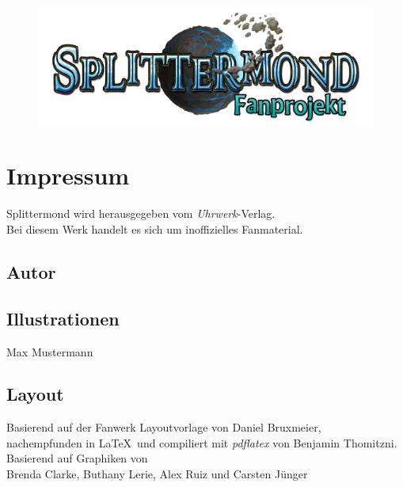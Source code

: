 \documentclass[12pt, a4paper, twoside, openany]{book}
\begin{document}
{%

        {%
            \begin{center}
                    \color{spmblue}
                    \fontsize{40}{50}
                    \selectfont
                    \textbf{\MyTitle}
            \end{center}
       }%
       \begin{figure}[t]
               \centering
               \includegraphics[scale=0.8]{bilder/Splittermond-Logo_fan_v2.png}
       \end{figure}
       
       \vfill
        \section*{Impressum}%
        \begin{center}
        Splittermond wird herausgegeben vom \textit{Uhrwerk}-Verlag.\\
        Bei diesem Werk handelt es sich um inoffizielles Fanmaterial.        
        \end{center}
        \subsection*{Autor}
        \begin{center} 
        \MyAuthor
        \end{center}
        \subsection*{Illustrationen}
        \begin{center}
        Max Mustermann        
        \end{center}

        \subsection*{Layout}
        \begin{center}
                Basierend auf der Fanwerk Layoutvorlage von Daniel Bruxmeier,\\ nachempfunden in \LaTeX ~und compiliert mit \textit{pdflatex} von Benjamin Thomitzni. \\
        Basierend auf Graphiken von \\ 
        Brenda Clarke, Buthany Lerie, Alex Ruiz und Carsten Jünger         
        \end{center}
}
\end{document}
